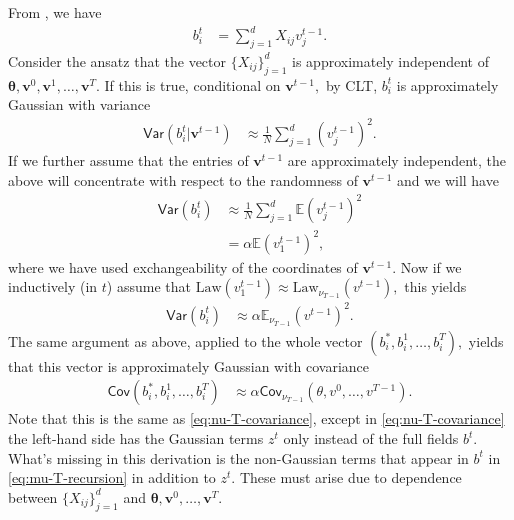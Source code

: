 \documentclass{article}
\newcommand{\1}{\mathbbm{1}}
\theoremstyle{plain}
\theoremstyle{definition}
\theoremstyle{remark}
\newcommand{\E}{\mathbb{E}}
\newcommand{\Var}{\mathsf{Var}}
\newcommand{\Law}{\mathrm{Law}}
\newcommand{\bfv}{\boldsymbol{v}}
\newcommand{\bftheta}{\boldsymbol{\theta}}
\newcommand{\Cov}{\mathsf{Cov}}
\begin{document}
From , we have
\begin{align*}
    b^t_i &= \sum_{j=1}^d X_{ij}v_j^{t-1}.
\end{align*}
Consider the ansatz that the vector $\{X_{ij}\}_{j=1}^d$ is approximately independent of $\bftheta,\bfv^0,\bfv^1,\dots,\bfv^{T}.$ If this is true, conditional on $\bfv^{t-1},$ by CLT, $b_i^t$ is approximately Gaussian with variance
\begin{align*}
    \Var(b_i^t|\bfv^{t-1}) &\approx \frac{1}{N}\sum_{j=1}^d (v_j^{t-1})^2.
\end{align*}
If we further assume that the entries of $\bfv^{t-1}$ are approximately independent, the above will concentrate with respect to the randomness of $\bfv^{t-1}$ and we will have
\begin{align*}
    \Var(b_i^t) &\approx \frac{1}{N}\sum_{j=1}^d\E (v_j^{t-1})^2 \\
    &= \alpha \E (v_1^{t-1})^2,
\end{align*}
where we have used exchangeability of the coordinates of $\bfv^{t-1}.$ Now if we inductively (in $t$) assume that $\Law(v_1^{t-1}) \approx \Law_{\nu_{T-1}}(v^{t-1}),$ this yields
\begin{align*}
    \Var(b_i^t) &\approx \alpha \E_{\nu_{T-1}} (v^{t-1})^2.
\end{align*}
The same argument as above, applied to the whole vector $(b^*_i,b^1_i,\dots,b^T_i),$ yields that this vector is approximately Gaussian with covariance
\begin{align*}
    \Cov(b^*_i,b^1_i,\dots,b^T_i) &\approx \alpha \Cov_{\nu_{T-1}}(\theta,v^0,\dots,v^{T-1}).
\end{align*}
Note that this is the same as \eqref{eq:nu-T-covariance}, except in \eqref{eq:nu-T-covariance} the left-hand side has the Gaussian terms $z^t$ only instead of the full fields $b^t$. What's missing in this derivation is the non-Gaussian terms that appear in $b^t$ in \eqref{eq:mu-T-recursion} in addition to $z^t.$ These must arise due to dependence between $\{X_{ij}\}_{j=1}^d$ and $\bftheta,\bfv^0,\dots,\bfv^T.$
\end{document}
